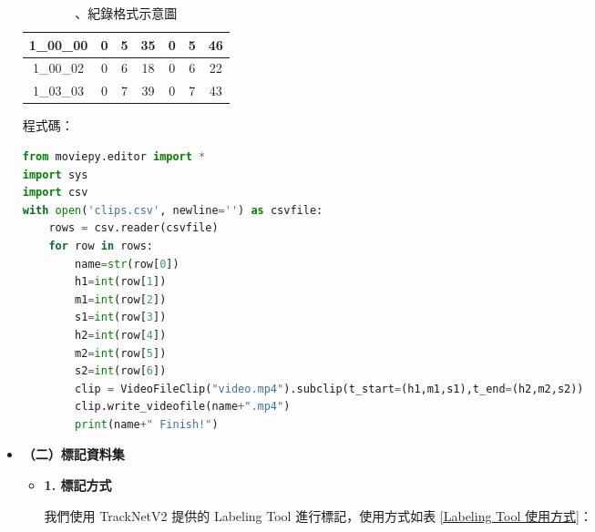 \begin{itemize}
    \begin{table}[H]
        \centering
        \caption{、紀錄格式示意圖}
        \label{紀錄格式示意圖}
        \begin{tabular}{ccccccc}
            \hline
            1\_00\_00 & 0 & 5 & 35 & 0 & 5 & 46\\
            \hline
            1\_00\_02 & 0 & 6 & 18 & 0 & 6 & 22\\
            \hline
            1\_03\_03 & 0 & 7 & 39 & 0 & 7 & 43\\
            \hline
        \end{tabular}
    \end{table}

\begin{figure}[H]
\end{figure}

    程式碼：
    \begin{lstlisting}[language={Python}]
from moviepy.editor import *
import sys
import csv
with open('clips.csv', newline='') as csvfile:
    rows = csv.reader(csvfile)
    for row in rows:
        name=str(row[0])
        h1=int(row[1])
        m1=int(row[2])
        s1=int(row[3])
        h2=int(row[4])
        m2=int(row[5])
        s2=int(row[6])
        clip = VideoFileClip("video.mp4").subclip(t_start=(h1,m1,s1),t_end=(h2,m2,s2))
        clip.write_videofile(name+".mp4")
        print(name+" Finish!")
    \end{lstlisting}
    \item []
    \textbf{（二）標記資料集}
    
    \begin{itemize}
        \setlength\parindent{2em}
        \item []
        \textbf{1. 標記方式}

        我們使用 TrackNetV2 提供的 Labeling Tool 進行標記，使用方式如表 \ref{Labeling Tool 使用方式}：


\end{itemize}
\end{itemize}
